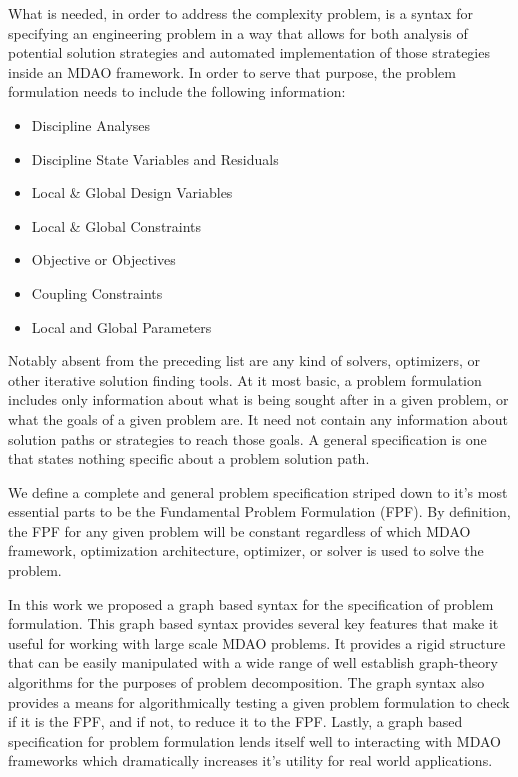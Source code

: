 \documentclass[]{aiaa-tc} %
\begin{document}
    What is needed, in order to address the complexity problem, is a syntax for specifying an engineering problem 
    in a way that allows for both analysis of potential solution strategies and automated implementation of those strategies 
    inside an MDAO framework. In order to serve that purpose, the problem formulation needs to include the following information: 
    \begin{itemize}
       \item Discipline Analyses 
       \item Discipline State Variables and Residuals
       \item Local \& Global Design Variables
       \item Local \& Global Constraints
       \item Objective or Objectives
       \item Coupling Constraints
       \item Local and Global Parameters
    \end{itemize}
    Notably absent from the preceding list are any kind of solvers, optimizers, or other iterative solution finding tools. 
    At it most basic, a problem formulation includes only information about what is being sought after in a given problem, or what the
    goals of a given problem are. It need not contain any information about solution paths or strategies to reach those goals. 
    A general specification is one that states nothing specific about a problem solution path. 

    We define a complete and general problem specification striped down to it's most essential parts to be the 
    Fundamental Problem Formulation (FPF). By definition, the FPF for any given problem will be constant regardless 
    of which MDAO framework, optimization architecture, optimizer, or solver is used to solve the problem.

    In this work we proposed a graph based syntax for the specification of problem formulation. This graph based syntax provides several key
    features that make it useful for working with large scale MDAO problems. It provides a rigid structure that can be easily manipulated 
    with a wide range of well establish graph-theory algorithms for the purposes of problem decomposition. The graph syntax also 
    provides a means for algorithmically testing a given problem formulation to check if it is the FPF, and if not, to reduce it to the FPF. 
    Lastly, a graph based specification for problem formulation lends itself well to interacting with MDAO frameworks which dramatically 
    increases it's utility for real world applications. 
\end{document}
